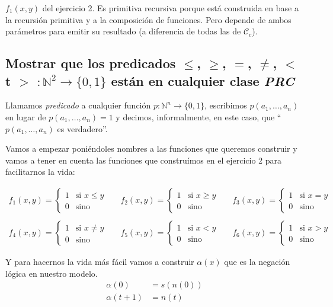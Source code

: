\documentclass[fleqn, 11pt]{article}
\newcommand{\nat}{\mathbb{N}}
\newcommand{\Ccur}{\mathcal{C}}
\begin{document}
$f_1(x, y)$ del ejercicio 2. Es primitiva recursiva porque está construida en
base a la recursión primitiva y a la composición de funciones. Pero depende de
ambos parámetros para emitir su resultado (a diferencia de todas las de
$\Ccur_c$).

\subsection{Mostrar que los predicados $\leq$, $\geq$, $=$, $\neq$, $<$ t $>$
$:\nat^2 \to \{0, 1\}$ están en cualquier clase \emph{PRC}}

Llamamos \emph{predicado} a cualquier función $p: \nat^n \to \{0, 1\}$,
escribimos $p(a_1, \dots, a_n)$ en lugar de $p(a_1, \dots, a_n)=1$ y decimos,
informalmente, en este caso, que ``$p(a_1, \dots, a_n)$ es verdadero''.

Vamos a empezar poniéndoles nombres a las funciones que queremos construir y
vamos a tener en cuenta las funciones que construímos en el ejercicio 2 para
facilitarnos la vida:

\begin{align*}
	f_1(x, y)=
	\begin{cases}
		1 & \text{si } x\leq y \\
		0 & \text{sino}
	\end{cases} &&
	f_2(x, y)=
	\begin{cases}
		1 & \text{si } x\geq y \\
		0 & \text{sino}
	\end{cases} &&
	f_3(x, y)=
	\begin{cases}
		1 & \text{si } x=y \\
		0 & \text{sino}
	\end{cases} \\ \\
	f_4(x, y)=
	\begin{cases}
		1 & \text{si } x\neq y \\
		0 & \text{sino}
	\end{cases} &&
	f_5(x, y)=
	\begin{cases}
		1 & \text{si } x<y \\
		0 & \text{sino}
	\end{cases} &&
	f_6(x, y)=
	\begin{cases}
		1 & \text{si } x>y \\
		0 & \text{sino}
	\end{cases}
\end{align*}

Y para hacernos la vida más fácil vamos a construir $\alpha(x)$ que es la
negación lógica en nuestro modelo.
\begin{align*}
	\alpha(0)     &= s(n(0)) \\
	\alpha(t + 1) &= n(t)
\end{align*}
\end{document}
